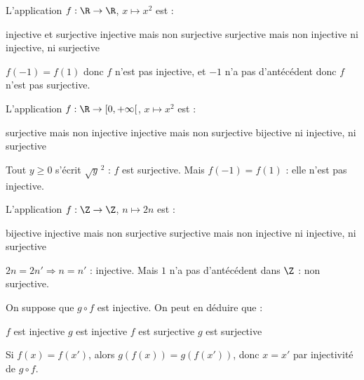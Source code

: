 
\begin{question}
L'application $f:\R\to\R$, $x\mapsto x^2$ est :
\begin{reponses}
  \mauvaise injective et surjective
  \mauvaise injective mais non surjective
  \mauvaise surjective mais non injective
  \bonne ni injective, ni surjective
\end{reponses}
\begin{explication}
$f(-1)=f(1)$ donc $f$ n'est pas injective, et $-1$ n'a pas d'antécédent donc $f$ n'est pas surjective.
\end{explication}
\end{question}

\begin{question}
L'application $f:\R\to[0,+\infty[$, $x\mapsto x^2$ est :
\begin{reponses}
  \bonne surjective mais non injective
  \mauvaise injective mais non surjective
  \mauvaise bijective
  \mauvaise ni injective, ni surjective
\end{reponses}
\begin{explication}
Tout $y\ge0$ s'écrit $\sqrt y^{\,2}$ : $f$ est surjective. Mais $f(-1)=f(1)$ : elle n'est pas injective.
\end{explication}
\end{question}

\begin{question}
L'application $f:\Z\to\Z$, $n\mapsto 2n$ est :
\begin{reponses}
  \mauvaise bijective
  \bonne injective mais non surjective
  \mauvaise surjective mais non injective
  \mauvaise ni injective, ni surjective
\end{reponses}
\begin{explication}
$2n=2n'\Rightarrow n=n'$ : injective. Mais $1$ n'a pas d'antécédent dans $\Z$ : non surjective.
\end{explication}
\end{question}

\begin{question}
On suppose que $g\circ f$ est injective. On peut en déduire que :
\begin{reponses}
  \bonne $f$ est injective
  \mauvaise $g$ est injective
  \mauvaise $f$ est surjective
  \mauvaise $g$ est surjective
\end{reponses}
\begin{explication}
Si $f(x)=f(x')$, alors $g(f(x))=g(f(x'))$, donc $x=x'$ par injectivité de $g\circ f$.
\end{explication}
\end{question}

